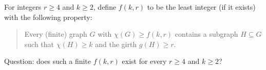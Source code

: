 For integers $r\ge4$ and $k\ge2$, define $f(k,r)$ to be the least integer (if it exists) with the following property:

\begin{quote}
Every (finite) graph $G$ with $\chi(G)\ge f(k,r)$ contains a subgraph $H\subseteq G$ such that $\chi(H)\ge k$ and the girth $g(H)\ge r$.
\end{quote}

Question: does such a finite $f(k,r)$ exist for every $r\ge4$ and $k\ge2$?
